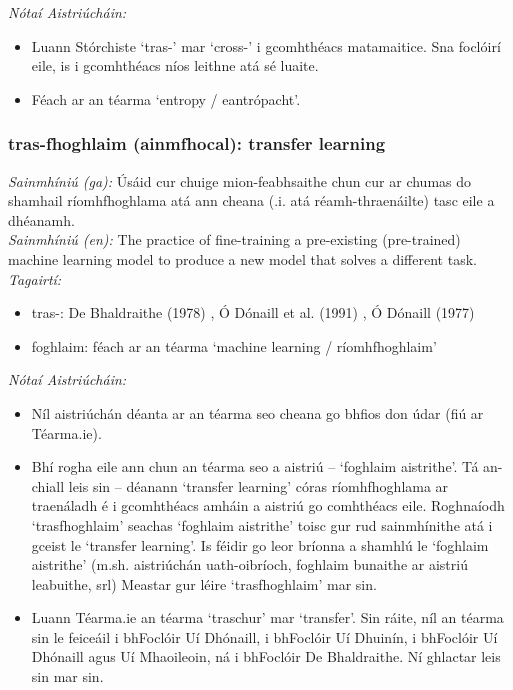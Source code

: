 \documentclass{article}
\begin{document}
 \noindent \textit{Nótaí Aistriúcháin:}
\begin{itemize}
	\item Luann Stórchiste `tras-' mar `cross-' i gcomhthéacs matamaitice. Sna foclóirí eile, is i gcomhthéacs níos leithne atá sé luaite.
	\item Féach ar an téarma `entropy / eantrópacht'.
\end{itemize}


\subsubsection*{tras-fhoghlaim (ainmfhocal): transfer learning}
 \noindent \textit{Sainmhíniú (ga):} Úsáid cur chuige mion-feabhsaithe chun cur ar chumas do shamhail ríomhfhoghlama atá ann cheana (.i. atá réamh-thraenáilte) tasc eile a dhéanamh.
\\
 \noindent \textit{Sainmhíniú (en):} The practice of fine-training a pre-existing (pre-trained) machine learning model to produce a new model that solves a different task.
\\
 \noindent \textit{Tagairtí:}
\begin{itemize}
	\item tras-: De Bhaldraithe (1978) \cite{de-bhaldraithe}, Ó Dónaill et al. (1991) \cite{focloir-beag}, Ó Dónaill (1977) \cite{odonaill}
	\item foghlaim: féach ar an téarma `machine learning / ríomhfhoghlaim'
\end{itemize}

 \noindent \textit{Nótaí Aistriúcháin:}
\begin{itemize}
	\item Níl aistriúchán déanta ar an téarma seo cheana go bhfios don údar (fiú ar Téarma.ie).
	\item Bhí rogha eile ann chun an téarma seo a aistriú -- `foghlaim aistrithe'. Tá an-chiall leis sin -- déanann `transfer learning' córas ríomhfhoghlama ar traenáladh é i gcomhthéacs amháin a aistriú go comhthéacs eile. Roghnaíodh `trasfhoghlaim' seachas `foghlaim aistrithe' toisc gur rud sainmhínithe atá i gceist le `transfer learning'. Is féidir go leor bríonna a shamhlú le `foghlaim aistrithe' (m.sh. aistriúchán uath-oibríoch, foghlaim bunaithe ar aistriú leabuithe, srl) Meastar gur léire `trasfhoghlaim' mar sin.
	\item Luann Téarma.ie an téarma `traschur' mar `transfer'. Sin ráite, níl an téarma sin le feiceáil i bhFoclóir Uí Dhónaill, i bhFoclóir Uí Dhuinín, i bhFoclóir Uí Dhónaill agus Uí Mhaoileoin, ná i bhFoclóir De Bhaldraithe. Ní ghlactar leis sin mar sin.
\end{itemize}
\end{document}
